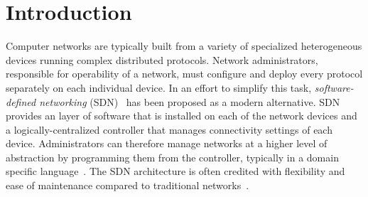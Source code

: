 

\newcommand{\souffle}{Souffl\'{e}\xspace}
\newcommand{\vampire}{Vampire\xspace}
\newcommand{\eprover}{E\xspace}
\newcommand{\spass}{Spass\xspace}


\newcommand{\Datalog}{Datalog\xspace}

\newcommand*{\rl}{\mathrel{\leftarrow}}
\newcommand*{\comma}{\mathrel{\wedge}}

\renewcommand*{\phi}{\varphi}

\newcommand{\typedRel}[1]{\mathit{#1}}
\newcommand{\typed}[2]{\typedRel{#1}({#2})}

\newcommand{\pred}[1]{\mathit{#1}} %
\newcommand{\const}[1]{\mathrm{#1}} %
\newcommand{\type}[1]{\mathrm{#1}} %

\newcommand{\sem}[1]{(#1)} %

\def\eolqed{\hspace{\stretch1}\ensuremath\qedsymbol}

\newcommand{\PS}[1]{\textcolor{blue}{PS: {{#1}}}}

\section{Introduction}
\label{sect:aws/introduction}
Computer networks are typically built from a variety of specialized heterogeneous devices running complex distributed 
protocols. Network administrators, responsible for operability of a network, must configure and deploy every protocol 
separately on each individual device. In an effort to simplify this task, \emph{software-defined networking} (SDN)~\cite{SDN} 
has been proposed as a modern alternative. SDN provides an layer of software that is installed on each of the network 
devices and a logically-centralized controller that manages connectivity settings of each device. Administrators can 
therefore manage networks at a higher level of abstraction by programming them from the controller, typically in a domain 
specific language~\cite{DBLP:journals/cm/FosterGRSFKMRRSWH13}. The SDN architecture is often credited with flexibility and ease 
of maintenance compared to traditional networks~\cite{benzekki2016software}.

